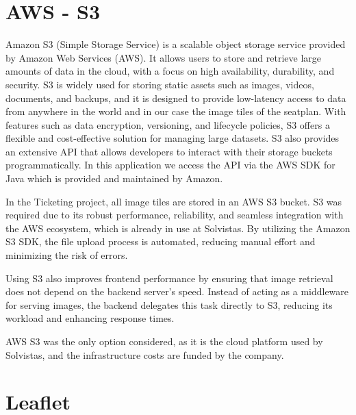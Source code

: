 \section{AWS - S3}
Amazon S3 (Simple Storage Service) is a scalable object storage service provided by Amazon Web Services (AWS). It allows users to store and retrieve large amounts of data in the cloud, with a focus on high availability, durability, and security. S3 is widely used for storing static assets such as images, videos, documents, and backups, and it is designed to provide low-latency access to data from anywhere in the world and in our case the image tiles of the seatplan. With features such as data encryption, versioning, and lifecycle policies, S3 offers a flexible and cost-effective solution for managing large datasets. S3 also provides an extensive API that allows developers to interact with their storage buckets programmatically. In this application we access the API via the AWS SDK for Java which is provided and maintained by Amazon.

In the Ticketing project, all image tiles are stored in an AWS S3 bucket. S3 was required due to its robust performance, reliability, and seamless integration with the AWS ecosystem, which is already in use at Solvistas. By utilizing the Amazon S3 SDK, the file upload process is automated, reducing manual effort and minimizing the risk of errors.

Using S3 also improves frontend performance by ensuring that image retrieval does not depend on the backend server’s speed. Instead of acting as a middleware for serving images, the backend delegates this task directly to S3, reducing its workload and enhancing response times.

AWS S3 was the only option considered, as it is the cloud platform used by Solvistas, and the infrastructure costs are funded by the company.


\section{Leaflet}
